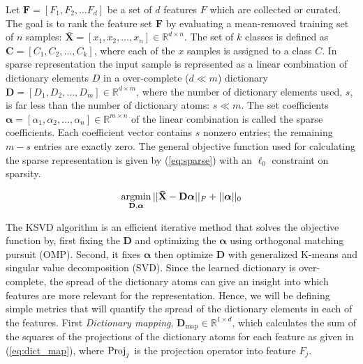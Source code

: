     
    
    
    Let $\mathbf{F} = [F_1, F_2, \dots F_d]$ be a set of $d$ features $F$ which are collected or curated. The goal is to rank the feature set $\mathbf{F}$ by evaluating a mean-removed training set of $n$ samples: $\mathbf{\bar{X}} = [x_1, x_2, \dots, x_n] \in \mathbb{R}^{d \times n}$. The set of $k$ classes is defined as $\mathbf{C} = [C_1, C_2, \dots, C_k]$, where each of the $x$ samples is assigned to a class $C$. In sparse representation the input sample is represented as a linear combination of dictionary elements $D$ in a over-complete ($d \ll m$) dictionary $\mathbf{D} = [D_1, D_2, \dots, D_m] \in \mathbb{R}^{d \times m}$, where the number of dictionary elements used, $s$, is far less than the number of dictionary atoms: $s \ll m$. The set coefficients $\bm{\alpha} = [\alpha_1, \alpha_2, \dots, \alpha_n] \in \mathbb{R}^{m \times n}$ of the linear combination is called the sparse coefficients. Each coefficient vector contains $s$ nonzero entries; the remaining $m-s$ entries are exactly zero. The general objective function used for calculating the sparse representation is given by (\ref{eq:sparse}) with an $\ell_0$ constraint on sparsity.
    
    \begin{equation}
        \label{eq:sparse}
        \operatorname*{argmin}_{\mathbf{D},\bm{\alpha}} ||\mathbf{\bar{X}}- \mathbf{D}\bm{\alpha}||_F + ||\bm{\alpha}||_0
    \end{equation}
    
    The KSVD algorithm is an efficient iterative method that solves the objective function by, first fixing the $\mathbf{D}$ and optimizing the $\bm{\alpha}$ using orthogonal matching pursuit (OMP)\cite{Pati1993}. Second, it fixes $\bm{\alpha}$ then optimize $\mathbf{D}$ with generalized K-means and singular value decomposition (SVD). Since the learned dictionary is over-complete, the spread of the dictionary atoms can give an insight into which features are more relevant for the representation. Hence, we will be defining simple metrics that will quantify the spread of the dictionary elements in each of the features. First \emph{Dictionary mapping}, $\mathbf{D}_\textrm{map} \in \mathbb{R}^{1 \times d}$, which calculates the sum of the squares of the projections of the dictionary atoms for each feature as given in (\ref{eq:dict_map}), where $\operatorname*{Proj}_j$ is the projection operator into feature $F_j$. 
    
    
